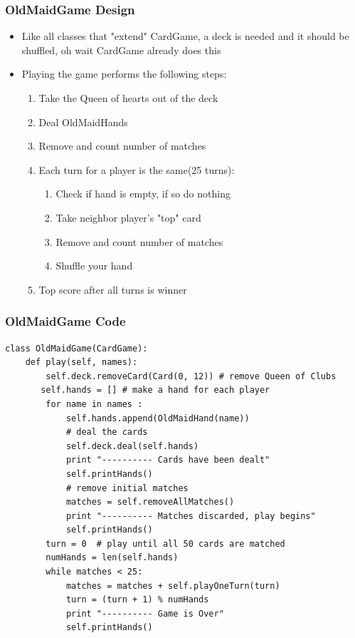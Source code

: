 \documentclass{beamer}
\newcommand\Fontix{\fontsize{9}{8.3}\selectfont}
\begin{document}
\begin{frame}[fragile]
\frametitle{OldMaidGame Design}
\begin{itemize}
\item Like all classes that "extend" CardGame, a deck is needed and it should be shuffled, oh wait CardGame already does this
\item Playing the game performs the following steps:
\begin{enumerate}
\item Take the Queen of hearts out of the deck
\item Deal OldMaidHands
\item Remove and count number of matches
\item Each turn for a player is the same(25 turns):
\begin{enumerate}
\item Check if hand is empty, if so do nothing
\item Take neighbor player's "top" card
\item Remove and count number of matches
\item Shuffle your hand
\end{enumerate}
\item Top score after all turns is winner
\end{enumerate}
\end{itemize} 
\end{frame}

\begin{frame}[fragile]
\frametitle{OldMaidGame Code}
\Fontix
\begin{lstlisting}
class OldMaidGame(CardGame):
    def play(self, names):
        self.deck.removeCard(Card(0, 12)) # remove Queen of Clubs 
       self.hands = [] # make a hand for each player 
        for name in names :
            self.hands.append(OldMaidHand(name))
            # deal the cards 
            self.deck.deal(self.hands)
            print "---------- Cards have been dealt"
            self.printHands()
            # remove initial matches 
            matches = self.removeAllMatches()
            print "---------- Matches discarded, play begins"
            self.printHands()
	    turn = 0  # play until all 50 cards are matched 
        numHands = len(self.hands)
        while matches < 25:
            matches = matches + self.playOneTurn(turn)
            turn = (turn + 1) % numHands
            print "---------- Game is Over"
            self.printHands()
\end{lstlisting}
\end{frame}
\end{document}
